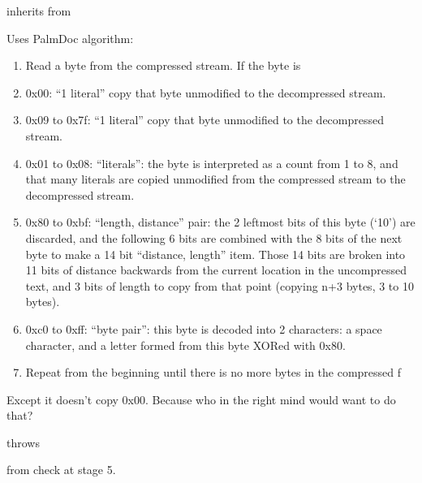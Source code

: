 \documentclass[letterpaper,10pt,english]{sphinxmanual}
\begin{document}
\begin{fulllineitems}
\label{compression:mobi::pd_compression}
inherits from {\hyperref[compression:mobi::compression]{}}

Uses PalmDoc algorithm:
\begin{enumerate}
\item {} 
Read a byte from the compressed stream. If the byte is

\item {} 
0x00: ``1 literal'' copy that byte unmodified to the decompressed stream.

\item {} 
0x09 to 0x7f: ``1 literal'' copy that byte unmodified to the decompressed stream.

\item {} 
0x01 to 0x08: ``literals'': the byte is interpreted as a count from 1 to 8, and that many literals are copied unmodified from the compressed stream to the decompressed stream.

\item {} 
0x80 to 0xbf: ``length, distance'' pair: the 2 leftmost bits of this byte (`10') are discarded, and the following 6 bits are combined with the 8 bits of the next byte to make a 14 bit ``distance, length'' item. Those 14 bits are broken into 11 bits of distance backwards from the current location in the uncompressed text, and 3 bits of length to copy from that point (copying n+3 bytes, 3 to 10 bytes).

\item {} 
0xc0 to 0xff: ``byte pair'': this byte is decoded into 2 characters: a space character, and a letter formed from this byte XORed with 0x80.

\item {} 
Repeat from the beginning until there is no more bytes in the compressed f

\end{enumerate}

Except it doesn't copy 0x00. Because who in the right mind would want to do that?

throws {\hyperref[exceptions:mobi::not_palmdoc_compression_exception]{}}

from check at stage 5.

\end{fulllineitems}

\end{document}
